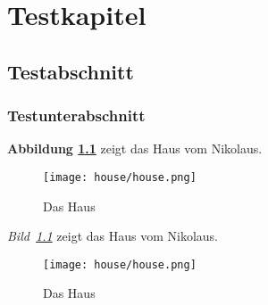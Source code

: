 \documentclass[12pt,a4paper]{scrbook}
\newcommand{\Abb}[1]{\textbf{Abbildung \ref{#1}}}
\begin{document}
\chapter{Testkapitel}
\section{Testabschnitt}
\subsection{Testunterabschnitt}
\clearpage

\Abb{fig:house} zeigt das Haus vom Nikolaus. 
\begin{figure}[htb]
	\centering
	\texttt{[image: house/house.png]}
	\caption{Das Haus}
	\label{fig:house}
\end{figure}

\renewcommand{\figurename}{Bild}
\renewcommand{\Abb}[1]{\textit{\figurename~\ref{#1}}}
\captionsetup{labelfont=it}

\Abb{fig:house} zeigt das Haus vom Nikolaus. 
\begin{figure}[htb]
	\centering
	\texttt{[image: house/house.png]}
	\caption{Das Haus}
	\label{fig:house2}
\end{figure}
\end{document}
